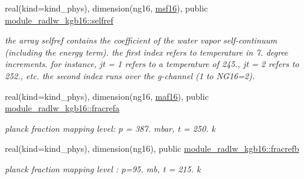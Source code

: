 \begin{DoxyCompactItemize}
\mbox{\label{group__module__radlw__kgbnn_gafaa2554e1161bd6c983ce630d39d703a}} 
real(kind=kind\+\_\+phys), dimension(ng16, \hyperlink{group__module__radlw__kgbnn_ga8601911604c1d6a1b32e434159ae95d2}{msf16}), public \hyperlink{group__module__radlw__kgbnn_gafaa2554e1161bd6c983ce630d39d703a}{module\+\_\+radlw\+\_\+kgb16\+::selfref}
\begin{DoxyCompactList}\small\item\em the array selfref contains the coefficient of the water vapor self-\/continuum (including the energy term). the first index refers to temperature in 7. degree increments. for instance, jt = 1 refers to a temperature of 245., jt = 2 refers to 252., etc. the second index runs over the g-\/channel (1 to N\+G16=2). \end{DoxyCompactList}\item 
\mbox{\label{group__module__radlw__kgbnn_ga355dcc9f6f4955ab3d7ee0a22005c8ba}} 
real(kind=kind\+\_\+phys), dimension(ng16, \hyperlink{group__module__radlw__kgbnn_gaae4c96f4a2ae49c573189f2d63ccd4a3}{maf16}), public \hyperlink{group__module__radlw__kgbnn_ga355dcc9f6f4955ab3d7ee0a22005c8ba}{module\+\_\+radlw\+\_\+kgb16\+::fracrefa}
\begin{DoxyCompactList}\small\item\em planck fraction mapping level\+: p = 387. mbar, t = 250. k \end{DoxyCompactList}\item 
\mbox{\label{group__module__radlw__kgbnn_gab93affafac8e2bb182982133a6449de4}} 
real(kind=kind\+\_\+phys), dimension(ng16), public \hyperlink{group__module__radlw__kgbnn_gab93affafac8e2bb182982133a6449de4}{module\+\_\+radlw\+\_\+kgb16\+::fracrefb}
\begin{DoxyCompactList}\small\item\em planck fraction mapping level \+: p=95. mb, t = 215. k \end{DoxyCompactList}\end{DoxyCompactItemize}
